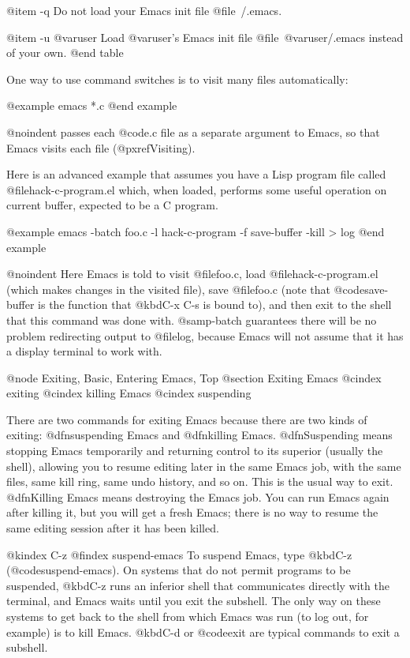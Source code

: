 {{@item -q
Do not load your Emacs init file @file{~/.emacs}.

@item -u @var{user}
Load @var{user}'s Emacs init file @file{~@var{user}/.emacs} instead of
your own.
@end table

  One way to use command switches is to visit many files automatically:

@example
emacs *.c
@end example

@noindent
passes each @code{.c} file as a separate argument to Emacs, so that Emacs
visits each file (@pxref{Visiting}).
  
  Here is an advanced example that assumes you have a Lisp program
file called @file{hack-c-program.el} which, when loaded, performs some
useful operation on current buffer, expected to be a C program.

@example
emacs -batch foo.c -l hack-c-program -f save-buffer -kill > log
@end example

@noindent
Here Emacs is told to visit @file{foo.c}, load @file{hack-c-program.el}
(which makes changes in the visited file), save @file{foo.c} (note that
@code{save-buffer} is the function that @kbd{C-x C-s} is bound to), and
then exit to the shell that this command was done with.  @samp{-batch}
guarantees there will be no problem redirecting output to @file{log},
because Emacs will not assume that it has a display terminal to work with.

@node Exiting, Basic, Entering Emacs, Top
@section Exiting Emacs
@cindex exiting
@cindex killing Emacs
@cindex suspending

  There are two commands for exiting Emacs because there are two kinds of
exiting: @dfn{suspending} Emacs and @dfn{killing} Emacs.  @dfn{Suspending} means
stopping Emacs temporarily and returning control to its superior (usually
the shell), allowing you to resume editing later in the same Emacs job,
with the same files, same kill ring, same undo history, and so on.  This is
the usual way to exit.  @dfn{Killing} Emacs means destroying the Emacs job.
You can run Emacs again after killing it, but you will get a fresh Emacs;
there is no way to resume the same editing session after it has been
killed.

@kindex C-z
@findex suspend-emacs
  To suspend Emacs, type @kbd{C-z} (@code{suspend-emacs}).  On systems that do not
permit programs to be suspended, @kbd{C-z} runs an inferior shell that
communicates directly with the terminal, and Emacs waits until you exit
the subshell.  The only way on these systems to get back to the shell from
which Emacs was run (to log out, for example) is to kill Emacs.  @kbd{C-d} or
@code{exit} are typical commands to exit a subshell.  

}}
